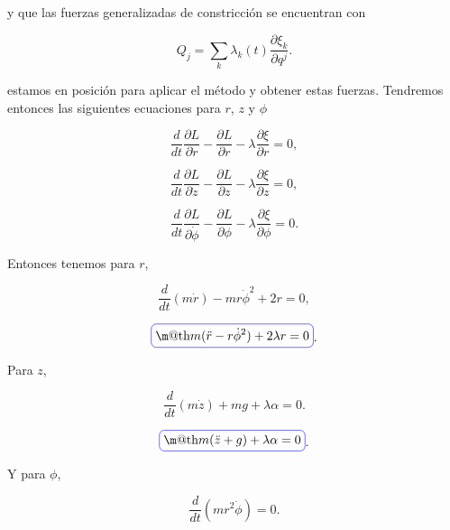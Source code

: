 \documentclass[a4paper,10pt]{article}
\makeatletter
\numberwithin{equation}{section}
\newcommand*{\boxcolor}{blue}
\renewcommand{\boxed}[1]{\textcolor{\boxcolor}{%
\tikz[baseline={([yshift=-1ex]current bounding box.center)}] \node [rectangle, minimum width=1ex,rounded corners,draw] {\normalcolor\m@th$\displaystyle#1$};}}
\makeatother
\begin{document}
y que las fuerzas generalizadas de constricción se encuentran con

\begin{equation}
 Q_j = \sum_k \lambda_k(t) \frac{\partial \xi_k}{\partial q^j}.
 \label{eq:fuerzasConstri1}
\end{equation}

estamos en posición para aplicar el método y obtener estas fuerzas. Tendremos entonces 
las siguientes ecuaciones para $r$, $z$ y $\phi$

\begin{equation}
 \frac{d}{dt}\frac{\partial L}{\partial \dot{r}} - \frac{\partial L}{\partial r}
 - \lambda \frac{\partial \xi}{\partial r} = 0,
\end{equation}

\begin{equation}
 \frac{d}{dt}\frac{\partial L}{\partial \dot{z}} - \frac{\partial L}{\partial z}
 - \lambda \frac{\partial \xi}{\partial z} = 0,
\end{equation}

\begin{equation}
 \frac{d}{dt}\frac{\partial L}{\partial \dot{\phi}} - \frac{\partial L}{\partial \phi}
 - \lambda \frac{\partial \xi}{\partial \phi} = 0.
\end{equation}

Entonces tenemos para $r$,

\begin{equation}
  \frac{d}{dt}(m\dot{r}) - m r\dot{\phi}^2 + 2 r = 0,
\end{equation}

\begin{equation}
 \boxed{m(\ddot{r} - r\dot{\phi}^2) + 2 \lambda r = 0}.
 \label{eq:ecuMovimientoR}
\end{equation}

Para $z$,

\begin{equation}
 \frac{d}{dt}(m\dot{z}) + mg + \lambda \alpha = 0.
\end{equation}

\begin{equation}
 \boxed{m(\ddot{z}+g) + \lambda \alpha = 0 }.
 \label{eq:ecuMovimientoZ}
\end{equation}

Y para $\phi$,

\begin{equation}
 \frac{d}{dt}(mr^2\dot{\phi}) = 0.
\end{equation}
\end{document}
